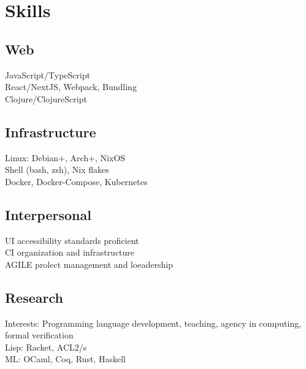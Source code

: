 \documentclass[letterpaper]{cv} %
\begin{document}
\begin{minipage}[t]{0.33\textwidth}
  \sectionspace


  \section{Skills}
  \subsection{Web}
  \textbullet{} JavaScript/TypeScript \\
  \textbullet{} React/NextJS, Webpack, Bundling \\
  \textbullet{} Clojure/ClojureScript \\
  \sectionspace
  \subsection{Infrastructure}
  \textbullet{} Linux: Debian+, Arch+, NixOS \\
  \textbullet{}Shell (bash, zsh), Nix flakes \\
  \textbullet{} Docker, Docker-Compose, Kubernetes \\

  \sectionspace
  \subsection{Interpersonal}
  \textbullet{} UI accessibility standards proficient \\
  \textbullet{} CI organization and infrastructure \\
  \textbullet{} AGILE prolect management and loeadership \\

  \sectionspace
  \subsection{Research}
  Interests: Programming language development,
  teaching, agency in computing, formal verification \\
  \textbullet{} Lisp: Racket, ACL2/s \\
  \textbullet{} ML: OCaml, Coq, Rust, Haskell \\
  \sectionspace

\end{minipage} %
\end{document}
